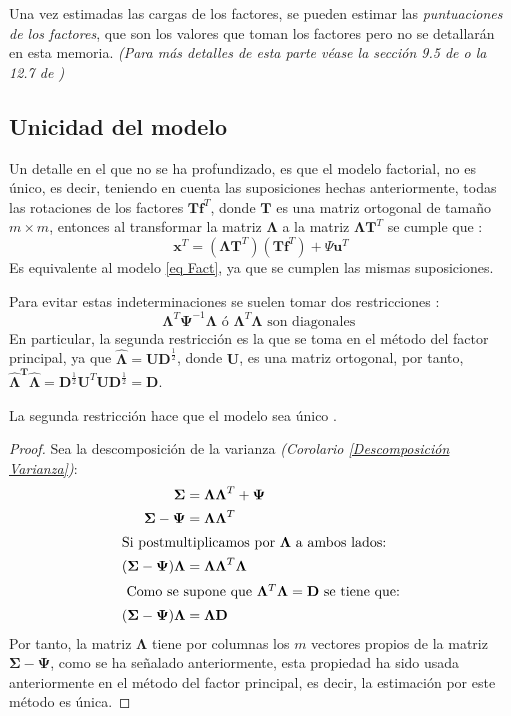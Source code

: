 \noindent Una vez estimadas las cargas de los factores, se pueden estimar las \emph{puntuaciones de los factores}, que son los valores que toman los factores pero no se detallarán en esta memoria.  \emph{(Para más detalles de esta parte véase  la sección 9.5 de \cite{Johnson 2007} o la 12.7 de \cite{Peña 2002})}

\subsection{Unicidad del modelo}

\noindent Un detalle en el que no se ha profundizado, es que el modelo factorial, no es único, es decir, teniendo en cuenta las suposiciones hechas anteriormente, todas las rotaciones de los factores $\mathbf{Tf}^T$, donde $\mathbf{T}$ es una matriz ortogonal de tamaño $m\times m$, entonces al transformar la matriz $\mathbf{\Lambda}$ a la matriz $\mathbf{\Lambda T}^T$ se cumple que \cite{Mardia 1979}:
\begin{equation}
\mathbf{x}^T=(\mathbf{\Lambda T}^T)(\mathbf{Tf}^T)+\Psi\mathbf{u}^T
\end{equation}
\noindent Es equivalente al modelo \ref{eq Fact}, ya que se cumplen las mismas suposiciones. 

\noindent Para evitar estas indeterminaciones se suelen tomar dos restricciones \cite{Mardia 1979}:
\begin{equation}
\mathbf{\Lambda}^T \mathbf{\Psi}^{-1}\mathbf{\Lambda} \text{ ó } \mathbf{\Lambda}^T \mathbf{\Lambda} \text{ son diagonales }
\end{equation}
\noindent En particular, la segunda restricción es la que se toma en el método del factor principal, ya que $\mathbf{\hat{\Lambda}}=\mathbf{UD}^{\frac{1}{2}}$, donde $\mathbf{U}$, es una matriz ortogonal, por tanto, $\mathbf{\hat{\Lambda}^T \hat{\Lambda}}=\mathbf{D}^{\frac{1}{2}}\mathbf{U}^T\mathbf{U}\mathbf{D}^{\frac{1}{2}}=\mathbf{D}$. 

\begin{propo}
La segunda restricción hace que el modelo sea único \cite{Peña 2002}. 
\begin{proof}
Sea la descomposición de la varianza \emph{(Corolario \ref{Descomposición Varianza})}: \begin{align*}
\mathbf{\Sigma}&=\mathbf{\Lambda\Lambda}^T+\mathbf{\Psi}\\
\mathbf{\Sigma}-\mathbf{\Psi}&=\mathbf{\Lambda\Lambda}^T\\
\intertext{Si postmultiplicamos por $\mathbf{\Lambda}$ a ambos lados:}
(\mathbf{\Sigma}-\mathbf{\Psi})\mathbf{\Lambda}&=\mathbf{\Lambda\Lambda}^T \mathbf{\Lambda}\\
\intertext{ Como se supone que $\mathbf{\Lambda}^T \mathbf{\Lambda}=\mathbf{D}$ se tiene que:}
(\mathbf{\Sigma}-\mathbf{\Psi})\mathbf{\Lambda}&=\mathbf{\Lambda D}
\end{align*}
Por tanto, la matriz $\mathbf{\Lambda}$ tiene por columnas los $m$ vectores propios de la matriz $\mathbf{\Sigma-\Psi}$, como se ha señalado anteriormente, esta propiedad ha sido usada anteriormente en el método del factor principal, es decir, la estimación por este método es única. 
\end{proof}
\end{propo}

